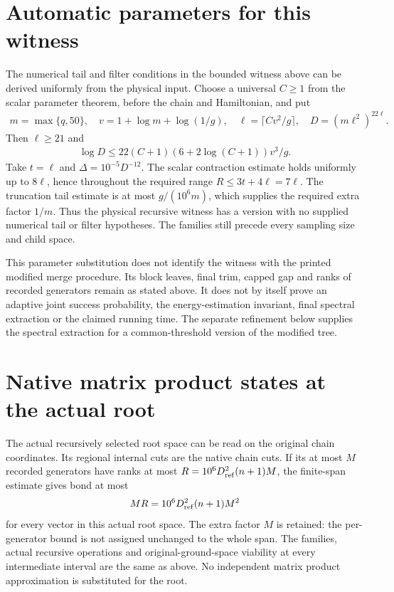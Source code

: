 \documentclass{article}
\begin{document}
\section*{Automatic parameters for this witness}

The numerical tail and filter conditions in the bounded witness above can
be derived uniformly from the physical input. Choose a universal $C\ge1$
from the scalar parameter theorem, before the chain and Hamiltonian, and put
\begin{align}
    m=\max\{q,50\},\quad v=1+\log m+\log(1/g),\quad
    \ell=\lceil Cv^2/g\rceil,\quad D=(m\ell^2)^{22\ell}.
    \label{eq:alvv_approximation_automatic_window_parameters}
\end{align}
Then $\ell\ge21$ and
\begin{align}
    \log D\le22(C+1)(6+2\log(C+1))v^3/g.
    \label{eq:alvv_approximation_automatic_count_bound}
\end{align}
Take $t=\ell$ and $\Delta=10^{-5}D^{-12}$. The scalar contraction
estimate holds uniformly up to $8\ell$, hence throughout the required
range $R\le3t+4\ell=7\ell$. The truncation tail estimate is at most
$g/(10^6m)$, which supplies the required extra factor $1/m$.
Thus the physical recursive witness has a version with no supplied
numerical tail or filter hypotheses. The families still precede every
sampling size and child space.

This parameter substitution does not identify the witness with the
printed modified merge procedure. Its block leaves, final trim, capped
gap and ranks of recorded generators remain as stated above. It does
not by itself prove an adaptive joint success probability, the
energy-estimation invariant, final spectral extraction or the claimed
running time. The separate refinement below supplies the spectral
extraction for a common-threshold version of the modified tree.


\section*{Native matrix product states at the actual root}

The actual recursively selected root space can be read on the original
chain coordinates. Its regional internal cuts are the native chain cuts.
If its at most $M$ recorded generators have ranks at most
$R=10^6D_{\rm ref}^2(n+1)M$, the finite-span estimate gives bond at most
\begin{align}
    MR=10^6D_{\rm ref}^2(n+1)M^2
    \label{eq:alvv_approximation_root_bond_bound}
\end{align}
for every vector in this actual root space. The extra factor $M$ is
retained: the per-generator bound is not assigned unchanged to the whole
span. The families, actual recursive operations and original-ground-space
viability at every intermediate interval are the same as above. No
independent matrix product approximation is substituted for the root.
\end{document}
